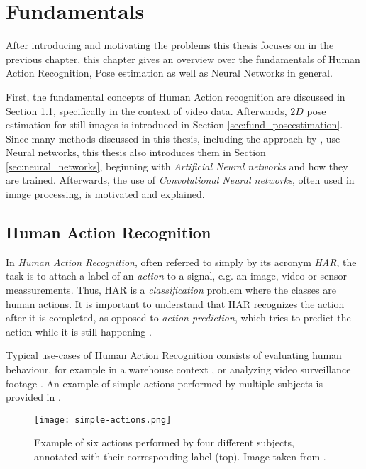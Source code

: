 \chapter{Fundamentals}
After introducing and motivating the problems this thesis focuses on in the previous chapter, this chapter gives an overview over the fundamentals of Human Action Recognition, Pose estimation as well as Neural Networks in general.

First, the fundamental concepts of Human Action recognition are discussed in Section \ref{sec:fund_har}, specifically in the context of video data.
Afterwards, $2D$ pose estimation for still images is introduced in Section \ref{sec:fund_poseestimation}.
Since many methods discussed in this thesis, including the approach by \cite{luvizon_2d/3d_2018}, use Neural networks, this thesis also introduces them in Section \ref{sec:neural_networks}, beginning with \textit{Artificial Neural networks} and how they are trained.
Afterwards, the use of \textit{Convolutional Neural networks}, often used in image processing, is motivated and explained.

\section{Human Action Recognition}
\label{sec:fund_har}
In \textit{Human Action Recognition}, often referred to simply by its acronym \textit{HAR}, the task is to attach a label of an \textit{action} to a signal, e.g. an image, video or sensor meassurements.
Thus, HAR is a \textit{classification} problem where the classes are human actions.
It is important to understand that HAR recognizes the action after it is completed, as opposed to \textit{action prediction}, which tries to predict the action while it is still happening \cite{kong_human_2018}.

Typical use-cases of Human Action Recognition consists of evaluating human behaviour, for example in a warehouse context \cite{reining_towards_2018}, or analyzing video surveillance footage \cite{htike_human_2014}.
An example of simple actions performed by multiple subjects is provided in .

\begin{figure}[htb!]
    \centering
    \texttt{[image: simple-actions.png]}
    \caption{Example of six actions performed by four different subjects, annotated with their corresponding label (top). Image taken from \cite{laptev_learning_2008}. }
    \label{fig:simple-actions}
\end{figure}

